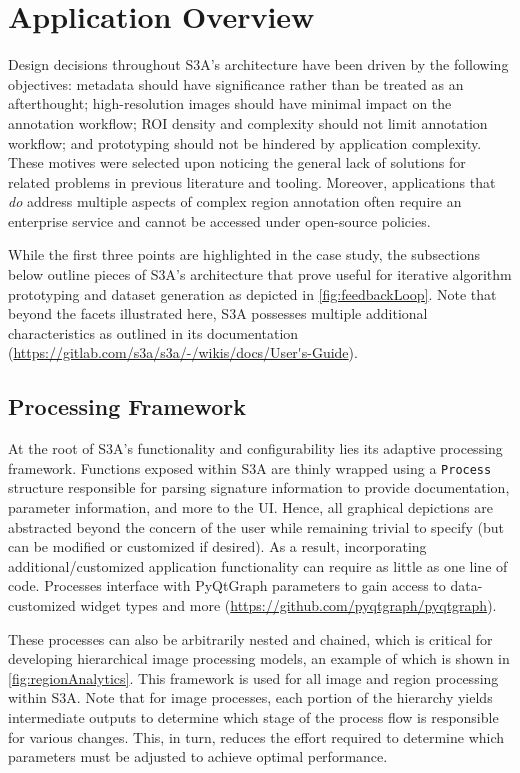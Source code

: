\section{Application Overview}\label{sec:appFeatures}
Design decisions throughout S3A's architecture have been driven by the following objectives: metadata should have significance rather than be treated as an afterthought; high-resolution images should have minimal impact on the annotation workflow; ROI density and complexity should not limit annotation workflow; and prototyping should not be hindered by application complexity.
These motives were selected upon noticing the general lack of solutions for related problems in previous literature and tooling.
Moreover, applications that \emph{do} address multiple aspects of complex region annotation often require an enterprise service and cannot be accessed under open-source policies.

While the first three points are highlighted in the case study, the subsections below outline pieces of S3A's architecture that prove useful for iterative algorithm prototyping and dataset generation as depicted in \autoref{fig:feedbackLoop}.
Note that beyond the facets illustrated here, S3A possesses multiple additional characteristics as outlined in its documentation (\url{https://gitlab.com/s3a/s3a/-/wikis/docs/User's-Guide}).

\makeFeedbackLoopFig

\subsection{Processing Framework}\label{sec:procFramework}
At the root of S3A's functionality and configurability lies its adaptive processing framework.
Functions exposed within S3A are thinly wrapped using a \texttt{Process} structure responsible for parsing signature information to provide documentation, parameter information, and more to the UI.
Hence, all graphical depictions are abstracted beyond the concern of the user while remaining trivial to specify (but can be modified or customized if desired).
As a result, incorporating additional/customized application functionality can require as little as one line of code.
Processes interface with PyQtGraph parameters to gain access to data-customized widget types and more (\url{https://github.com/pyqtgraph/pyqtgraph}).

These processes can also be arbitrarily nested and chained, which is critical for developing hierarchical image processing models, an example of which is shown in \autoref{fig:regionAnalytics}.
This framework is used for all image and region processing within S3A.
Note that for image processes, each portion of the hierarchy yields intermediate outputs to determine which stage of the process flow is responsible for various changes.
This, in turn, reduces the effort required to determine which parameters must be adjusted to achieve optimal performance.

